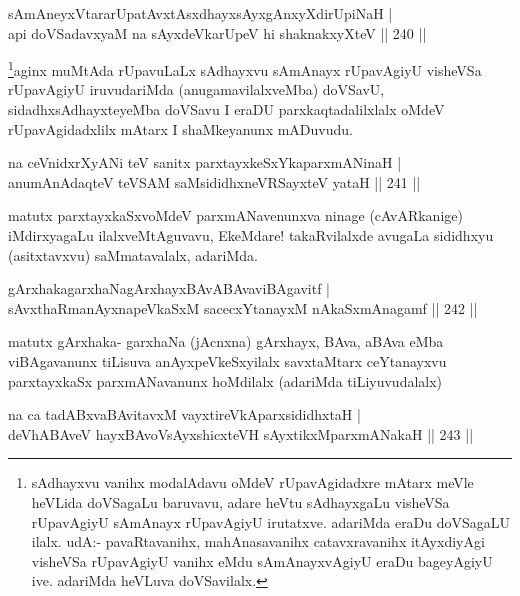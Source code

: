 
\begin{shl}
sAmAneyxVtararUpatAvxtAsxdhayxsAyxgAnxyXdirUpiNaH | \\
api doVSadavxyaM na sAyxdeVkarUpeV hi shaknakxyXteV \hfill ||  240 ||  
\end{shl}

\begin{artha}
\footnote{sAdhayxvu vanihx modalAdavu oMdeV rUpavAgidadxre mAtarx meVle heVLida doVSagaLu baruvavu, adare heVtu sAdhayxgaLu visheVSa rUpavAgiyU sAmAnayx rUpavAgiyU irutatxve. adariMda eraDu doVSagaLU ilalx. udA:- pavaRtavanihx, mahAnasavanihx catavxravanihx itAyxdiyAgi visheVSa rUpavAgiyU vanihx eMdu sAmAnayxvAgiyU eraDu bageyAgiyU ive. adariMda heVLuva doVSavilalx.}aginx muMtAda rUpavuLaLx sAdhayxvu sAmAnayx rUpavAgiyU visheVSa rUpavAgiyU iruvudariMda (anugamavilalxveMba) doVSavU, sidadhxsAdhayxteyeMba doVSavu I eraDU parxkaqtadalilxlalx oMdeV rUpavAgidadxlilx mAtarx I shaMkeyanunx mADuvudu.
\end{artha}

\begin{shl}
na ceVnidxrXyANi teV sanitx parxtayxkeSxYkaparxmANinaH | \\
anumAnAdaqteV teVSAM saMsididhxneVRSayxteV yataH \hfill ||  241 ||  
\end{shl}

\begin{artha}
matutx parxtayxkaSxvoMdeV parxmANavenunxva ninage (cAvARkanige) iMdirxyagaLu ilalxveMtAguvavu, EkeMdare! takaRvilalxde avugaLa sididhxyu (asitxtavxvu) saMmatavalalx, adariMda.
\end{artha}

\begin{shl}
gArxhakagarxhaNagArxhayxBAvABAvaviBAgavitf | \\
sAvxthaRmanAyxnapeVkaSxM sacecxYtanayxM nAkaSxmAnagamf \hfill ||  242 ||  
\end{shl}

\begin{artha}
matutx gArxhaka- garxhaNa (jAcnxna) gArxhayx, BAva, aBAva eMba viBAgavanunx tiLisuva anAyxpeVkeSxyilalx savxtaMtarx ceYtanayxvu parxtayxkaSx parxmANavanunx hoMdilalx (adariMda tiLiyuvudalalx) 
\end{artha}

\begin{shl}
na ca tadABxvaBAvitavxM vayxtireVkAparxsididhxtaH | \\
deVhABAveV hayxBAvoV\s sAyxshicxteVH sAyxtikxMparxmANakaH \hfill ||  243 ||  
\end{shl}

